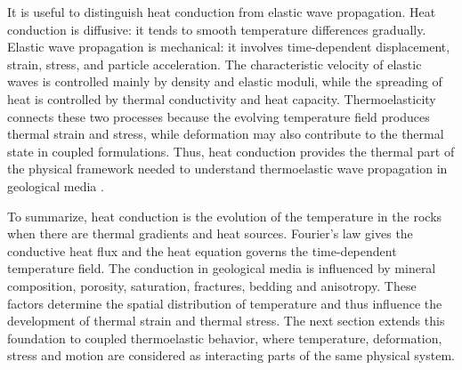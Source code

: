 It is useful to distinguish heat conduction from elastic wave propagation. Heat conduction is diffusive: it tends to smooth temperature differences gradually. Elastic wave propagation is mechanical: it involves time-dependent displacement, strain, stress, and particle acceleration. The characteristic velocity of elastic waves is controlled mainly by density and elastic moduli, while the spreading of heat is controlled by thermal conductivity and heat capacity. Thermoelasticity connects these two processes because the evolving temperature field produces thermal strain and stress, while deformation may also contribute to the thermal state in coupled formulations. Thus, heat conduction provides the thermal part of the physical framework needed to understand thermoelastic wave propagation in geological media \cite{nowacki1986,boley1960}.

To summarize, heat conduction is the evolution of the temperature in the rocks when there are thermal gradients and heat sources. Fourier's law gives the conductive heat flux and the heat equation governs the time-dependent temperature field. The conduction in geological media is influenced by mineral composition, porosity, saturation, fractures, bedding and anisotropy. These factors determine the spatial distribution of temperature and thus influence the development of thermal strain and thermal stress. The next section extends this foundation to coupled thermoelastic behavior, where temperature, deformation, stress and motion are considered as interacting parts of the same physical system.